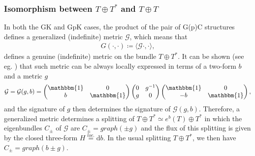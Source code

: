 \documentclass{article}
\newcommand{\TT}{{T\oplus T^*}}
\newcommand{\GG}{\mathcal{G}}
\newcommand{\id}{\mathbbm{1}}
\newcommand{\rd}{\mathrm{d}}
\newcommand{\la}{\langle}
\newcommand{\ra}{\rangle}
\theoremstyle{definition}
\theoremstyle{remark}
\begin{document}
\subsubsection{Isomorphism between $\TT$ and $T\oplus T$}\label{sec:isomorphism}
In both the GK and GpK cases, the product of the pair of G(p)C structures defines a generalized (indefinite) metric $\GG$, which means that
\begin{align*}
G(\cdot,\cdot)\coloneqq \la \GG\cdot,\cdot\ra,
\end{align*}
defines a genuine (indefinite) metric on the bundle $\TT$. It can be shown (see eg. \cite{Gualtieri:2003dx,Hu:2019zro}) that such metric can be always locally expressed in terms of a two-form $b$ and a metric $g$
\begin{align}\label{genmetric}
\GG=\GG(g,b)=\begin{pmatrix}
\id & 0 \\
b & \id
\end{pmatrix}
\begin{pmatrix}
0 & g^{-1} \\
g & 0
\end{pmatrix}
\begin{pmatrix}
\id & 0 \\
-b & \id
\end{pmatrix},
\end{align}
and the signature of $g$ then determines the signature of $\GG(g,b)$. Therefore, a generalized metric determines a splitting of $\TT\simeq e^b(T)\oplus T^*$ in which the eigenbundles $C_\pm$ of $\GG$ are $C_\pm=graph(\pm g)$ and the flux of this splitting is given by the closed three-form $H\overset{loc.}{=}\rd b$. In the usual splitting $\TT$, we then have $C_\pm=graph(b\pm g)$.
\end{document}
